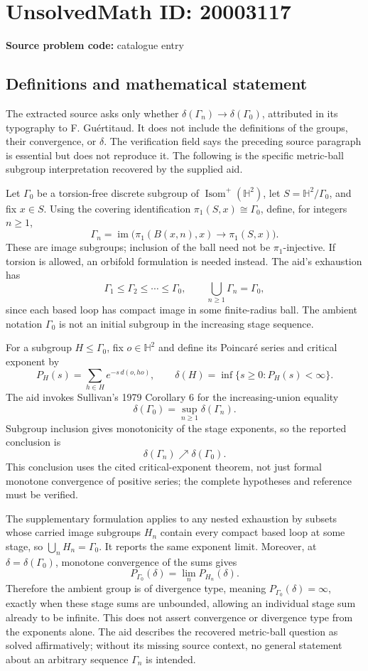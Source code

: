 \documentclass[11pt]{article}
\begin{document}
\section*{UnsolvedMath ID: 20003117}
\textbf{Source problem code:} catalogue entry
\subsection{Definitions and mathematical statement}
The extracted source asks only whether \(\delta(\Gamma_n)\to\delta(\Gamma_0)\), attributed in its typography to F. Gu\'ertitaud. It does not include the definitions of the groups, their convergence, or \(\delta\). The verification field says the preceding source paragraph is essential but does not reproduce it. The following is the specific metric-ball subgroup interpretation recovered by the supplied aid.

Let \(\Gamma_0\) be a torsion-free discrete subgroup of \(\operatorname{Isom}^+(\mathbb H^2)\), let \(S=\mathbb H^2/\Gamma_0\), and fix \(x\in S\). Using the covering identification \(\pi_1(S,x)\cong\Gamma_0\), define, for integers \(n\geq1\),
\[
 \Gamma_n=\operatorname{im}\bigl(\pi_1(B(x,n),x)\longrightarrow\pi_1(S,x)\bigr).
\]
These are image subgroups; inclusion of the ball need not be \(\pi_1\)-injective. If torsion is allowed, an orbifold formulation is needed instead. The aid's exhaustion has
\[
 \Gamma_1\leq\Gamma_2\leq\cdots\leq\Gamma_0,
 \qquad\bigcup_{n\geq1}\Gamma_n=\Gamma_0,
\]
since each based loop has compact image in some finite-radius ball. The ambient notation \(\Gamma_0\) is not an initial subgroup in the increasing stage sequence.

For a subgroup \(H\leq\Gamma_0\), fix \(o\in\mathbb H^2\) and define its Poincar\'e series and critical exponent by
\[
 P_H(s)=\sum_{h\in H}e^{-s\,d(o,ho)},\qquad
 \delta(H)=\inf\{s\geq0:P_H(s)<\infty\}.
\]
The aid invokes Sullivan's 1979 Corollary 6 for the increasing-union equality
\[
 \delta(\Gamma_0)=\sup_{n\geq1}\delta(\Gamma_n).
\]
Subgroup inclusion gives monotonicity of the stage exponents, so the reported conclusion is
\[
 \delta(\Gamma_n)\nearrow\delta(\Gamma_0).
\]
This conclusion uses the cited critical-exponent theorem, not just formal monotone convergence of positive series; the complete hypotheses and reference must be verified.

The supplementary formulation applies to any nested exhaustion by subsets whose carried image subgroups \(H_n\) contain every compact based loop at some stage, so \(\bigcup_nH_n=\Gamma_0\). It reports the same exponent limit. Moreover, at \(\delta=\delta(\Gamma_0)\), monotone convergence of the sums gives
\[
 P_{\Gamma_0}(\delta)=\lim_nP_{H_n}(\delta).
\]
Therefore the ambient group is of divergence type, meaning \(P_{\Gamma_0}(\delta)=\infty\), exactly when these stage sums are unbounded, allowing an individual stage sum already to be infinite. This does not assert convergence or divergence type from the exponents alone. The aid describes the recovered metric-ball question as solved affirmatively; without its missing source context, no general statement about an arbitrary sequence \(\Gamma_n\) is intended.
\end{document}

